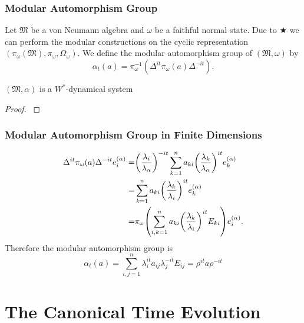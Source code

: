 \documentclass{beamer}
\begin{document}
\begin{frame}
	\frametitle{Modular Automorphism Group}
	\begin{definition}
		Let $\mathfrak{M}$ be a von Neumann algebra and $\omega$ be a faithful normal state. Due to $\bigstar$ we can perform the modular constructions on the cyclic representation $(\pi_\omega(\mathfrak{M}),\pi_\omega,\Omega_\omega)$. We define the modular automorphism group of $(\mathfrak{M},\omega)$ by 
		\begin{equation}
			\alpha_t(a)=\pi_\omega^{-1}(\Delta^{it}\pi_\omega(a)\Delta^{-it}).
		\end{equation}
	\end{definition}
	\begin{theorem}[$\bigstar\bigstar$]
		$(\mathfrak{M},\alpha)$ is a $W^*$-dynamical system  
	\end{theorem}		
	\begin{proof}
		\cite{Duvenhage1999}
	\end{proof}
\end{frame}

\begin{frame}

	\frametitle{Modular Automorphism Group in Finite Dimensions}
	
	\begin{Example}
		\begin{align}
		\begin{split}
			\Delta^{it}\pi_\omega(a)\Delta^{-it}e_i^{(\alpha)}=&\qty(\frac{\lambda_i}{\lambda_\alpha})^{-it}\sum_{k=1}^na_{ki}\qty(\frac{\lambda_k}{\lambda_\alpha})^{it}e_k^{(\alpha)}\\
			=&\sum_{k=1}^na_{ki}\qty(\frac{\lambda_k}{\lambda_i})^{it}e_k^{(\alpha)}\\
			=&\pi_\omega\qty(\sum_{i,k=1}^na_{ki}\qty(\frac{\lambda_k}{\lambda_i})^{it}E_{ki})e_i^{(\alpha)}.
		\end{split}
		\end{align}
		Therefore the modular automorphism group is
		\begin{equation}
			\alpha_t(a)=\sum_{i,j=1}^n\lambda_i^{it}a_{ij}\lambda_j^{-it}E_{ij}=\rho^{it}a\rho^{-it}
		\end{equation}
	\end{Example}

\end{frame}

\section{The Canonical Time Evolution}
\end{document}
